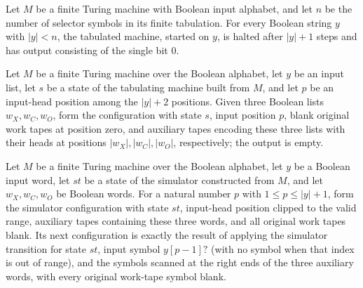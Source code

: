 \begin{theorem}
\label{Complexity.Meyer.sel_reject}
\leanok
{}
Let $M$ be a finite Turing machine with Boolean input alphabet, and let $n$ be the
number of selector symbols in its finite tabulation. For every Boolean string $y$ with
$|y|<n$, the tabulated machine, started on $y$, is halted after $|y|+1$ steps and has
output consisting of the single bit $0$.
\end{theorem}

\begin{definition}
\label{Complexity.Meyer.pcfg}
\leanok
{}
Let $M$ be a finite Turing machine over the Boolean alphabet, let $y$ be an input list,
let $s$ be a state of the tabulating machine built from $M$, and let $p$ be an
input-head position among the $|y|+2$ positions. Given three Boolean lists
$w_X,w_C,w_O$, form the configuration with state $s$, input position $p$, blank original
work tapes at position zero, and auxiliary tapes encoding these three lists with their
heads at positions $|w_X|,|w_C|,|w_O|$, respectively; the output is empty.
\end{definition}

\begin{theorem}
\label{Complexity.Meyer.pcfg_step}
\leanok
{}
Let $M$ be a finite Turing machine over the Boolean alphabet, let $y$ be a Boolean input
word, let $st$ be a state of the simulator constructed from $M$, and let $w_X,w_C,w_O$
be Boolean words. For a natural number $p$ with $1\le p\le |y|+1$, form the simulator
configuration with state $st$, input-head position clipped to the valid range, auxiliary
tapes containing these three words, and all original work tapes blank. Its next
configuration is exactly the result of applying the simulator transition for state $st$,
input symbol $y[p-1]?$ (with no symbol when that index is out of range), and the symbols
scanned at the right ends of the three auxiliary words, with every original work-tape
symbol blank.
\end{theorem}

